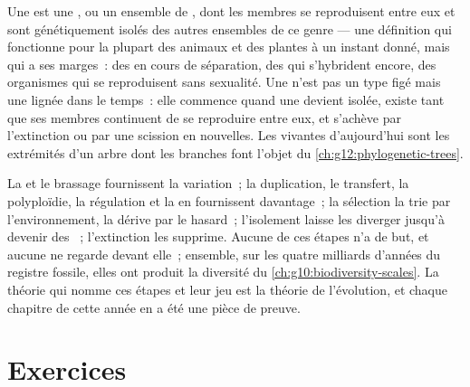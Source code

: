 \begin{proposition}\label{prop:g12:selection-drift-speciation:concept}
Une  est une , ou un ensemble de , dont les
membres se reproduisent entre eux et sont génétiquement isolés des
autres ensembles de ce genre --- une définition qui fonctionne pour la
plupart des animaux et des plantes à un instant donné, mais qui a ses
marges~: des  en cours de séparation, des  qui
s'hybrident encore, des organismes qui se reproduisent sans sexualité.
Une  n'est pas un type figé mais une lignée dans le temps~: elle
commence quand une  devient isolée, existe tant que ses
membres continuent de se reproduire entre eux, et s'achève par
l'extinction ou par une scission en  nouvelles. Les 
vivantes d'aujourd'hui sont les extrémités d'un arbre dont les branches
font l'objet du \cref{ch:g12:phylogenetic-trees}.
\end{proposition}
\admitted

\begin{remark}\label{rem:g12:selection-drift-speciation:assembled}
La  et le brassage fournissent la variation~; la duplication,
le transfert, la polyploïdie, la régulation et la  en
fournissent davantage~; la sélection la trie par l'environnement, la
dérive par le hasard~; l'isolement laisse les  diverger
jusqu'à devenir des ~; l'extinction les supprime. Aucune de ces
étapes n'a de but, et aucune ne regarde devant elle~; ensemble, sur les
quatre milliards d'années du registre fossile, elles ont produit la
diversité du \cref{ch:g10:biodiversity-scales}. La théorie qui nomme
ces étapes et leur jeu est la théorie de l'évolution, et chaque
chapitre de cette année en a été une pièce de preuve.
\end{remark}

\section{Exercices}

